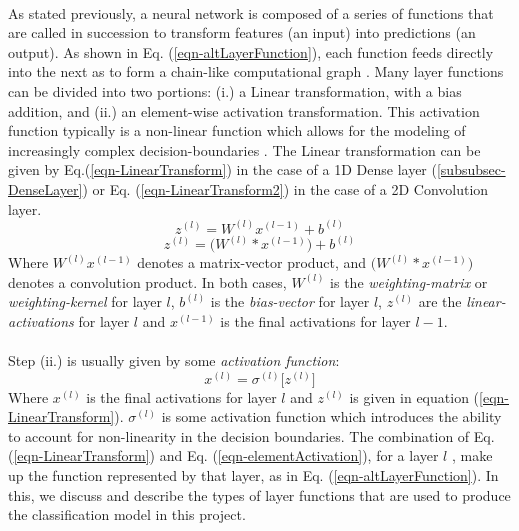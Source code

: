 \documentclass[12pt,letterpaper]{article}
\begin{document}
\paragraph*{}As stated previously, a neural network is composed of a series of functions that are called in succession to transform features (an input) into predictions (an output). As shown in Eq. (\ref{eqn-altLayerFunction}), each function feeds directly into the next as to form a chain-like computational graph \cite{Goodfellow}. Many layer functions can be divided into two portions: (i.) a Linear transformation, with a bias addition, and (ii.) an element-wise activation transformation. This activation function typically is a non-linear function which allows for the modeling of increasingly complex decision-boundaries \cite{Geron,Loy}. The Linear transformation can be given by Eq.(\ref{eqn-LinearTransform}) in the case of a 1D Dense layer (\ref{subsubsec-DenseLayer}) or Eq. (\ref{eqn-LinearTransform2}) in the case of a 2D Convolution layer.
\begin{equation}
\label{eqn-LinearTransform}
z^{(l)} = W^{(l)} x^{(l-1)} + b^{(l)}
\end{equation}
\begin{equation}
\label{eqn-LinearTransform2}
z^{(l)} = \big(W^{(l)} * x^{(l-1)}\big) + b^{(l)}
\end{equation} 
Where $W^{(l)} x^{(l-1)}$ denotes a matrix-vector product, and $\big(W^{(l)} * x^{(l-1)}\big)$ denotes a convolution product. In both cases, $W^{(l)}$ is the \textit{weighting-matrix} or \textit{weighting-kernel} for layer $l$, $b^{(l)}$ is the \textit{bias-vector} for layer $l$, $z^{(l)}$ are the \textit{linear-activations} for layer $l$ and $x^{(l-1)}$ is the final activations for layer $l-1$.

\paragraph*{}Step (ii.) is usually given by some \textit{activation function}:
\begin{equation}
\label{eqn-elementActivation}
x^{(l)} = \sigma^{(l)} \big[ z^{(l)} \big]
\end{equation}
Where $x^{(l)}$ is the final activations for layer $l$ and $z^{(l)}$ is given in equation (\ref{eqn-LinearTransform}). $\sigma^{(l)}$ is some activation function which introduces the ability to account for non-linearity in the decision boundaries. The combination of Eq. (\ref{eqn-LinearTransform}) and Eq. (\ref{eqn-elementActivation}), for a layer $l$ , make up the function represented by that layer, as in Eq. (\ref{eqn-altLayerFunction}). In this, we discuss and describe the types of layer functions that are used to produce the classification model in this project.
\end{document}
